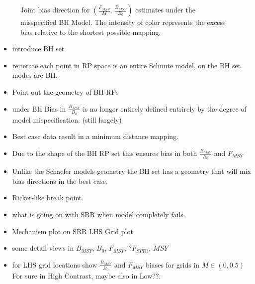 \documentclass[12pt]{article}
\begin{document}
\begin{figure}[h!]
\begin{minipage}[h!]{0.09\textwidth}
\end{minipage}
\caption{Joint bias direction for $\left(\frac{F_{MSY}}{M}\right.$, $\left.\frac{B_{MSY}}{B_0}\right)$ estimates under the misspecified BH Model. The intensity of color represents the excess bias relative to the shortest possible mapping.}
\end{figure}

\begin{itemize}
\item introduce BH set
\item reiterate each point in RP space is an entire Schnute model, on the BH set modes are BH.

\item Point out the geometry of BH RPs
\item under BH Bias in $\frac{B_{MSY}}{B_0}$ is no longer entirely defined entrirely by the degree of model mispecification.
(still largely)
\item Best case data result in a minimum distance mapping. 
\item Due to the shape of the BH RP set this ensures bias in both $\frac{B_{MSY}}{B_0}$ and $F_{MSY}$
\item Unlike the Schaefer models geometry the BH set has a geometry that will mix bias directions in the best case.

\item Ricker-like break point.
\item what is going on with SRR when model completely fails.
\item Mechanism plot on SRR LHS Grid plot

\item some detail views in $B_{MSY}$, $B_0$, $F_{MSY}$, $?F_{SPR?}$, $MSY$

\item for LHS grid locations show $\frac{B_{MSY}}{B_0}$ and $F_{MSY}$ biases for grids in $M\in(0,0.5)$ For sure in High Contrast, maybe also in Low??.
\end{itemize}

\end{document}
